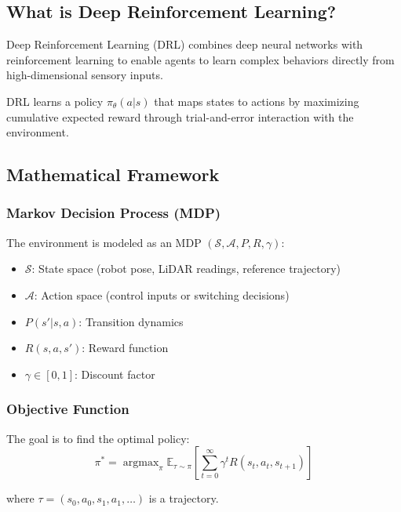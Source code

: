 \documentclass[11pt,a4paper]{article}
\newcommand{\E}{\mathbb{E}}
\newcommand{\argmax}{\operatorname{argmax}}
\begin{document}
\subsection{What is Deep Reinforcement Learning?}

Deep Reinforcement Learning (DRL) combines deep neural networks with reinforcement learning to enable agents to learn complex behaviors directly from high-dimensional sensory inputs.

\begin{drlbox}
DRL learns a policy $\pi_\theta(a|s)$ that maps states to actions by maximizing cumulative expected reward through trial-and-error interaction with the environment.
\end{drlbox}

\subsection{Mathematical Framework}

\subsubsection{Markov Decision Process (MDP)}

The environment is modeled as an MDP $(\mathcal{S}, \mathcal{A}, P, R, \gamma)$:
\begin{itemize}
  \item $\mathcal{S}$: State space (robot pose, LiDAR readings, reference trajectory)
  \item $\mathcal{A}$: Action space (control inputs or switching decisions)
  \item $P(s'|s,a)$: Transition dynamics
  \item $R(s,a,s')$: Reward function
  \item $\gamma \in [0,1]$: Discount factor
\end{itemize}

\subsubsection{Objective Function}

The goal is to find the optimal policy:
\begin{equation}
  \pi^* = \argmax_\pi \E_{\tau \sim \pi} \left[ \sum_{t=0}^{\infty} \gamma^t R(s_t, a_t, s_{t+1}) \right]
\end{equation}

where $\tau = (s_0, a_0, s_1, a_1, \ldots)$ is a trajectory.
\end{document}
